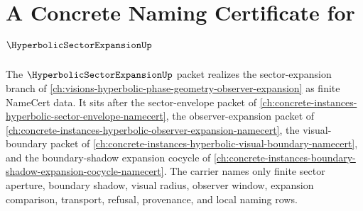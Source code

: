 \chapter{A Concrete Naming Certificate for $\HyperbolicSectorExpansionUp$}
\label{ch:concrete-instances-hyperbolic-sector-expansion-namecert}

The $\HyperbolicSectorExpansionUp$ packet realizes the sector-expansion branch
of \autoref{ch:visions-hyperbolic-phase-geometry-observer-expansion} as finite
NameCert data. It sits after the sector-envelope packet of
\autoref{ch:concrete-instances-hyperbolic-sector-envelope-namecert}, the
observer-expansion packet of
\autoref{ch:concrete-instances-hyperbolic-observer-expansion-namecert}, the
visual-boundary packet of
\autoref{ch:concrete-instances-hyperbolic-visual-boundary-namecert}, and the
boundary-shadow expansion cocycle of
\autoref{ch:concrete-instances-boundary-shadow-expansion-cocycle-namecert}. The
carrier names only finite sector aperture, boundary shadow, visual radius,
observer window, expansion comparison, transport, refusal, provenance, and
local naming rows.

